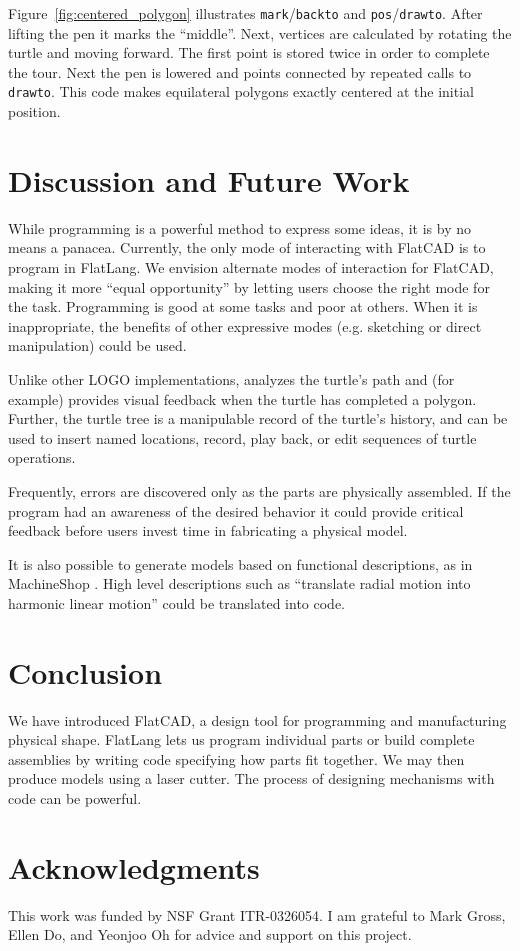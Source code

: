 \documentclass[times, 10pt,twocolumn]{article}
\begin{document}
Figure~\ref{fig:centered_polygon} illustrates
\textnhtt{mark}/\textnhtt{backto} and
\textnhtt{pos}/\textnhtt{drawto}. After lifting the pen it marks the
``middle''. Next, vertices are calculated by rotating the turtle
and moving forward. The first point is stored twice
in order to complete the tour. Next the pen is lowered and points
connected by repeated calls to \textnhtt{drawto}. This code makes
equilateral polygons exactly centered at the initial position.

\section{Discussion and Future Work}

While programming is a powerful method to express some ideas, it is by
no means a panacea. Currently, the only mode of interacting with
FlatCAD is to program in FlatLang. We envision alternate modes of
interaction for FlatCAD, making it more ``equal opportunity''
\cite{cockburn-leogo} by letting users choose the right mode for the
task. Programming is good at some tasks and poor at others. When it is
inappropriate, the benefits of other expressive modes (e.g. sketching
or direct manipulation) could be used.

Unlike other LOGO implementations,  analyzes the
turtle's path and (for example) provides visual feedback when the
turtle has completed a polygon. Further, the turtle tree is a
manipulable record of the turtle's history, and can be used to insert
named locations, record, play back, or edit sequences of turtle
operations.

Frequently, errors are discovered only as the parts are physically
assembled. If the program had an awareness of the desired behavior it
could provide critical feedback before users invest time in
fabricating a physical model.

It is also possible to generate models based on functional
descriptions, as in MachineShop \cite{blauvelt-automata}. High level
descriptions such as ``translate radial motion into harmonic linear
motion'' could be translated into code.

\section{Conclusion}

We have introduced \nohyphens{FlatCAD}, a design tool for programming
and manufacturing physical shape. FlatLang lets us program individual
parts or build complete assemblies by writing code specifying how
parts fit together. We may then produce models using a laser
cutter. The process of designing mechanisms with code can be powerful.

\section{Acknowledgments}

This work was funded by NSF Grant ITR-0326054. I am grateful to Mark
Gross, Ellen Do, and Yeonjoo Oh for advice and support on this
project.



\end{document}
